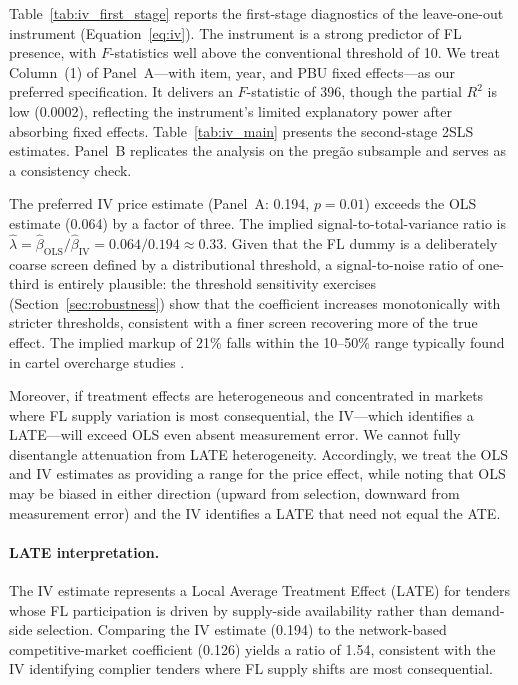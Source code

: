 Table~\ref{tab:iv_first_stage} reports the first-stage diagnostics of
the leave-one-out instrument (Equation~\ref{eq:iv}). The instrument is a
strong predictor of FL presence, with $F$-statistics well above the
conventional threshold of 10. We treat Column~(1) of Panel~A---with
item, year, and PBU fixed effects---as our preferred specification. It
delivers an $F$-statistic of 396, though the partial $R^2$ is low
(0.0002), reflecting the instrument's limited explanatory power after
absorbing fixed effects.
Table~\ref{tab:iv_main} presents the second-stage 2SLS estimates.
Panel~B replicates the analysis on the preg\~ao subsample and serves as
a consistency check.





The preferred IV price estimate (Panel~A: 0.194, $p = 0.01$) exceeds
the OLS estimate (0.064) by a factor of three. The implied
signal-to-total-variance ratio is
$\hat{\lambda} = \hat{\beta}_{\text{OLS}} / \hat{\beta}_{\text{IV}}
= 0.064 / 0.194 \approx 0.33$.
Given that the FL dummy is a deliberately coarse screen defined by a
distributional threshold, a signal-to-noise ratio of one-third is
entirely plausible: the threshold sensitivity exercises
(Section~\ref{sec:robustness}) show that the coefficient increases
monotonically with stricter thresholds, consistent with a finer screen
recovering more of the true effect. The implied markup of 21\% falls
within the 10--50\% range typically found in cartel overcharge studies
\citep{connor2007price}.

Moreover, if treatment effects are heterogeneous and concentrated in
markets where FL supply variation is most consequential, the
IV---which identifies a LATE---will exceed OLS even absent measurement
error. We cannot fully disentangle attenuation from LATE heterogeneity.
Accordingly, we treat the OLS and IV estimates as providing a range %
for the price effect, while noting that OLS may be biased in either
direction (upward from selection, downward from measurement error) and
the IV identifies a LATE that need not equal the ATE.

\paragraph{LATE interpretation.}
The IV estimate represents a Local Average Treatment Effect
(LATE) for tenders whose FL participation is driven by supply-side
availability rather than demand-side selection. Comparing the IV
estimate (0.194) to the network-based competitive-market coefficient
(0.126) yields a ratio of 1.54, consistent with the IV identifying
complier tenders where FL supply shifts are most consequential.

